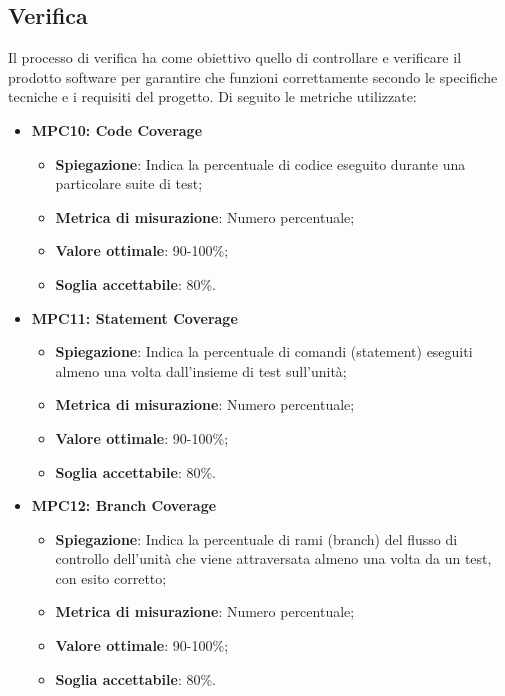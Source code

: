 \subsection{Verifica}
Il processo di verifica ha come obiettivo quello di controllare e verificare il prodotto software per garantire che funzioni correttamente secondo le specifiche tecniche e i requisiti del progetto. Di seguito le metriche utilizzate:

\begin{itemize}
    \item \textbf{MPC10: Code Coverage}
    \begin{itemize}
        \item \textbf{Spiegazione}: Indica la percentuale di codice eseguito durante una particolare suite di test;
        \item \textbf{Metrica di misurazione}: Numero percentuale;
        \item \textbf{Valore ottimale}: 90-100\%;
        \item \textbf{Soglia accettabile}: 80\%.
    \end{itemize}
\end{itemize}

\begin{itemize}
    \item \textbf{MPC11: Statement Coverage}
    \begin{itemize}
        \item \textbf{Spiegazione}: Indica la percentuale di comandi (statement) eseguiti almeno una volta dall'insieme di test sull'unità;
        \item \textbf{Metrica di misurazione}: Numero percentuale;
        \item \textbf{Valore ottimale}: 90-100\%;
        \item \textbf{Soglia accettabile}: 80\%.
    \end{itemize}
\end{itemize}

\begin{itemize}
    \item \textbf{MPC12: Branch Coverage}
    \begin{itemize}
        \item \textbf{Spiegazione}: Indica la percentuale di rami (branch) del flusso di controllo dell'unità che viene attraversata almeno una volta da un test, con esito corretto;
        \item \textbf{Metrica di misurazione}: Numero percentuale;
        \item \textbf{Valore ottimale}: 90-100\%;
        \item \textbf{Soglia accettabile}: 80\%.
    \end{itemize}
\end{itemize}

